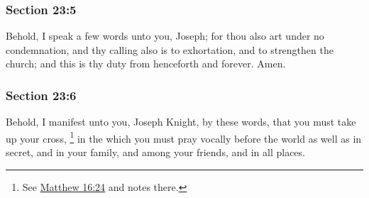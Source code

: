 
	\subsubsection{Section 23:5} %
		\label{DC23-5}

		Behold, I speak a few words unto you, Joseph; for thou also art under no condemnation, and thy calling also is to exhortation, and to strengthen the church; and this is thy duty from henceforth and forever. Amen.


	\subsubsection{Section 23:6} %
		\label{DC23-6}

		Behold, I manifest unto you, Joseph Knight, by these words, that you must take up your cross,%
			\footnote{%
				See \hyperref[MATTHEW-16-24]{Matthew 16:24} and notes there.
				}
		in the which you must pray vocally before the world as well as in secret, and in your family, and among your friends, and in all places.


